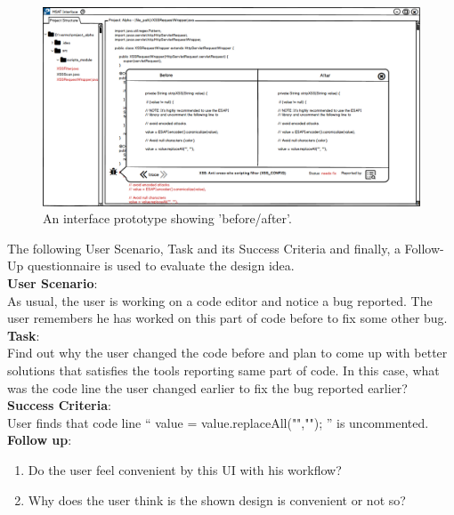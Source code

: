 \begin{figure}[hbt!]
	\centering
	\includegraphics[width=\linewidth]{figures/solution_ideas_snaps/S23_before_after}
	\caption{An interface prototype showing 'before/after'.}
	\label{fig:S23_before_after}
\end{figure}

The following User Scenario, Task and its Success Criteria and finally, a Follow-Up questionnaire is used to evaluate the design idea. \\

\textbf{User Scenario}: \\

As usual, the user is working on a code editor and notice a bug reported. The user remembers he has worked on this part of code before to fix some other bug. \\
 
\textbf{Task}: \\

Find out why the user changed the code before and plan to come up with better solutions that satisfies the tools reporting same part of code. In this case, what was the code line the user changed earlier to fix the bug reported earlier? \\

\textbf{Success Criteria}: \\

User finds that code line “ value = value.replaceAll("",""); ” is uncommented. \\

\clearpage
\textbf{Follow up}: \\

\begin{enumerate}
\item Do the user feel convenient by this UI with his workflow?
\item Why does the user think is the shown design is convenient or not so?
\end{enumerate}

